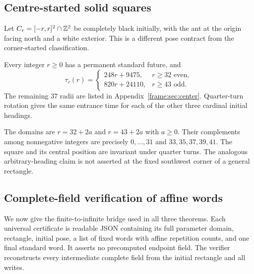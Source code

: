 \subsection{Centre-started solid squares}
Let $C_r=[-r,r]^2\cap\mathbb Z^2$ be completely black initially, with the ant at the origin facing north and a white exterior. This is a different pose contract from the corner-started classification.

\begin{theorem}\label{frame:thm:center}
Every integer $r\ge0$ has a permanent standard future, and
\[
 \tau_c(r)=
 \begin{cases}
 248r+9475,&r\ge32\text{ even},\\
 820r+24110,&r\ge43\text{ odd}.
 \end{cases}
\]
The remaining $37$ radii are listed in Appendix~\ref{frame:sec:center}. Quarter-turn rotation gives the same entrance time for each of the other three cardinal initial headings.
\end{theorem}
The domains are $r=32+2a$ and $r=43+2a$ with $a\ge0$. Their complements among nonnegative integers are precisely $0,\ldots,31$ and $33,35,37,39,41$. The square and its central position are invariant under quarter turns. The analogous arbitrary-heading claim is not asserted at the fixed southwest corner of a general rectangle.

\subsection{Complete-field verification of affine words}\label{frame:sec:verification}
We now give the finite-to-infinite bridge used in all three theorems. Each universal certificate is readable JSON containing its full parameter domain, rectangle, initial pose, a list of fixed words with affine repetition counts, and one final standard word. It asserts no precomputed endpoint field. The verifier reconstructs every intermediate complete field from the initial rectangle and all writes.

